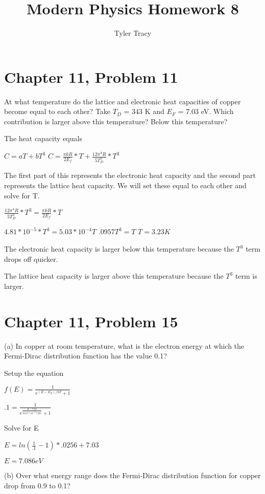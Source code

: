 \documentclass[12pt]{article}
\title{Modern Physics Homework 8}
\author{Tyler Tracy}
\begin{document}
\maketitle

\section*{Chapter 11, Problem 11}

At what temperature do the lattice and electronic heat capacities of copper become equal to each other? Take $T_D$ = 343 K and $E_F$ = 7.03 eV. Which contribution is larger above this temperature? Below this temperature?

The heat capacity equals

$ C = aT + bT^3 $
$ C = \frac{\pi k R}{2E_f} * T + \frac{12\pi^4R}{5T_D^3} * T^3 $

The first part of this represents the electronic heat capacity and the second part represents the lattice heat capacity. We will set these equal to each other and solve for T.

$ \frac{12\pi^4R}{5T_D^3} * T^3 = \frac{\pi k R}{2E_f} * T $

$ 4.81 * 10^{-5} * T^3 = 5.03 * 10^{-4} T $
$ .0957 T^3 = T $
$ T = 3.23 K $

The electronic heat capacity is larger below this temperature because the $T^3$ term drops off quicker.

The lattice heat capacity is larger above this temperature because the $T^3$ term is larger.


\section*{Chapter 11, Problem 15}

(a) In copper at room temperature, what is the electron energy at which the Fermi-Dirac distribution function has the value 0.1?

Setup the equation

$ f(E) = \frac{1}{e^{(E-E_F)/kT} + 1} $

$ .1 = \frac{1}{e^{\frac{E-7.03}{8.617*10^{-5}*295}} + 1} $

Solve for E

$E = ln(\frac{1}{.1} - 1)* .0256 + 7.03 $

$E = 7.086 eV $


(b) Over what energy range does the Fermi-Dirac distribution function for copper drop from 0.9 to 0.1?
\end{document}
